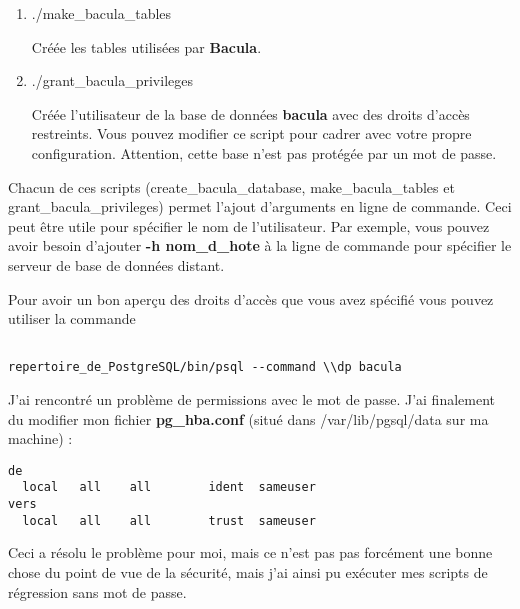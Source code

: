 {{{{\begin{enumerate}
\begin{verbatim}
   su
   (entrez le mot de passe root)
   su pgsql (ou postgres)
   createuser kern (ou peut-\^etre bacula)
   Shall the new user be allowed to create databases? (y/n) y
   Shall the new user be allowed to create more new users? (y/n) (choisissez ce que vous voulez)
   exit
\end{verbatim}


    A ce stade, vous devriez pouvoir ex\'ecuter la commande ./create\_bacula\_database

\item ./make\_bacula\_tables

   Cr\'e\'ee les tables utilis\'ees par {\bf Bacula}.  
\item ./grant\_bacula\_privileges

   Cr\'e\'ee l'utilisateur de la base de donn\'ees {\bf bacula} avec des droits
d'acc\`es restreints. Vous pouvez modifier ce script pour cadrer avec votre
propre configuration. Attention, cette base n'est pas prot\'eg\'ee par un mot
de passe.  

\end{enumerate}

Chacun de ces scripts (create\_bacula\_database, make\_bacula\_tables et
grant\_bacula\_privileges) permet l'ajout d'arguments en ligne de commande.
Ceci peut \^etre utile pour sp\'ecifier le nom de l'utilisateur. Par exemple,
vous pouvez avoir besoin d'ajouter {\bf -h nom\_d\_hote} \`a la ligne de
commande pour sp\'ecifier le serveur de base de donn\'ees distant. 

Pour avoir un bon aper\c{c}u des droits d'acc\`es que vous avez sp\'ecifi\'e
vous pouvez utiliser la commande 

\footnotesize
\begin{verbatim}

repertoire_de_PostgreSQL/bin/psql --command \\dp bacula
\end{verbatim}
\normalsize

J'ai rencontr\'e un probl\`eme de permissions avec le mot de passe. J'ai finalement 
du modifier mon fichier  {\bf pg\_hba.conf} (situ\'e dans /var/lib/pgsql/data sur ma 
machine) :

\footnotesize
\begin{verbatim}
de
  local   all    all        ident  sameuser
vers
  local   all    all        trust  sameuser
\end{verbatim}
\normalsize

Ceci a r\'esolu le probl\`eme pour moi, mais ce n'est pas pas forc\'ement une bonne 
chose du point de vue de la s\'ecurit\'e, mais j'ai ainsi pu ex\'ecuter mes scripts de 
r\'egression sans mot de passe.

}}}}
